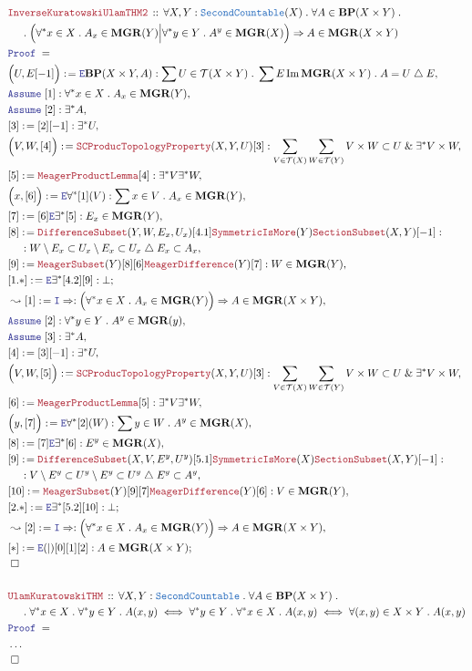 \documentclass[12pt]{scrartcl}
\newcommand{\TYPE}[1]{\textcolor{NavyBlue}{\mathtt{#1}}}
\newcommand{\LOGIC}[1]{\textcolor{Blue}{\mathtt{#1}}}
\newcommand{\THM}[1]{\textcolor{Maroon}{\mathtt{#1}}}
\renewcommand{\.}{\; . \;}
\newcommand{\de}{: \kern 0.1pc =}
\newcommand{\Theorem}[2]{& \THM{#1} \, :: \, #2 \\ & \Proof = \\ }
\newcommand{\NewLine}{\\ & \kern 1pc}
\newcommand{\Page}[1]{ \begin{align*} #1 \end{align*}   }
\newcommand{\NoProof}{ & \ldots \\ \EndProof}
\renewcommand{\And}{\; \& \;}
\newcommand{\Imply}{\Rightarrow}
\newcommand{\Intro}{\LOGIC{I}}
\newcommand{\Elim}{\LOGIC{E}}
\DeclareMathOperator*{\im}{Im}
\newcommand{\du}{\; \triangle \;}
\newcommand{\Say}[3]{& #1 \de #2 : #3, \\}
\newcommand{\Conclude}[3]{& #1 \de #2 : #3; \\}
\newcommand{\Derive}[3]{& \leadsto #1 \de #2 : #3, \\}
\newcommand{\Assume}[2]{& \LOGIC{Assume} \; #1 : #2, \\}
\newcommand{\QED}{\; \square}
\newcommand{\EndProof}{& \QED \\}
\newcommand{\Proof}{\LOGIC{Proof} \; }
\newcommand{\T}{\mathcal{T}}
\newcommand{\BP}{\mathbf{BP}}
\newcommand{\MGR}{\mathbf{MGR}}
\begin{document}
\Page{
	\Theorem{InverseKuratowskiUlamTHM2}
	{
		\forall X,Y : \TYPE{SecondCountable}(X) \.
		\forall A \in \BP(X \times Y) \. 
		\NewLine \. \Big(
		\forall^* x \in X \.  A_x \in \MGR(Y)
		\Big|
		\forall^* y \in Y \. A^y \in \MGR(X) \Big)
		\Imply
		A \in \MGR(X \times Y)
	}
	\Say{\Big(U,E [-1]\Big)}{\Elim \BP(X \times Y,A)}
	{
		\sum U \in \T(X \times Y) \.
		\sum E \im \MGR(X \times Y) \.
		A = U \du E 
	}
	\Assume{[1]}{\forall^* x \in X \.  A_x \in \MGR(Y)}
	\Assume{[2]}{\exists^* A}
	\Say{[3]}{[2][-1]}{\exists^* U}
	\Say{\Big(V,W,[4]\Big)}{\THM{SCProducTopologyProperty}(X,Y,U)[3]}
	{
		\sum_{V \in \T(X) }
		\sum_{W \in \T(Y)} 
		V \times W \subset U
		\And
		\exists^* V \times W
	}
	\Say{[5]}{\THM{MeagerProductLemma}[4]}
	{
			\exists^* V  \exists^* W
	}
	\Say{\Big(x,[6]\Big)}
	{
		\Elim \forall^* [1](V)
	}
	{
		\sum x \in V \. A_x \in \MGR(Y)
	}
	\Say{[7]}{[6]\Elim \exists^*[5]}
	{
		E_x \in \MGR(Y)
	}
	\Say{[8]}{
		\THM{DifferenceSubset}(Y,W,E_x,U_x)[4.1]
		\THM{SymmetricIsMore}(Y)
		\THM{SectionSubset}(X,Y)[-1]	
	}
	{
		\NewLine :
		W \setminus E_x \subset U_x \setminus E_x \subset U_x \du E_x \subset A_x 
	}
	\Say{[9]}{\THM{MeagerSubset}(Y)[8][6]\THM{MeagerDifference}(Y)[7]}
	{
		W \in \MGR(Y)
	}
	\Conclude{[1.*]}{\Elim \exists^* [4.2][9]}{\bot}
	\Derive{[1]}{\Intro \Imply}
	{
		\Big(\forall^* x \in X \. A_x \in \MGR(Y) \Big)
		\Imply
		A \in \MGR(X \times Y)
	}
	\Assume{[2]}{\forall^* y \in Y \.  A^y \in \MGR(y)}
	\Assume{[3]}{\exists^* A}
	\Say{[4]}{[3][-1]}{\exists^* U}
	\Say{\Big(V,W,[5]\Big)}{\THM{SCProducTopologyProperty}(X,Y,U)[3]}
	{
		\sum_{V \in \T(X) }
		\sum_{W \in \T(Y)} 
		V \times W \subset U
		\And
		\exists^* V \times W
	}
	\Say{[6]}{\THM{MeagerProductLemma}[5]}
	{
			\exists^* V  \exists^* W
	}
	\Say{\Big(y,[7]\Big)}
	{
		\Elim \forall^* [2](W)
	}
	{
		\sum y \in W \. A^y \in \MGR(X)
	}
	\Say{[8]}{[7]\Elim \exists^*[6]}
	{
		E^y \in \MGR(X)
	}
	\Say{[9]}{
		\THM{DifferenceSubset}(X,V,E^y,U^y)[5.1]
		\THM{SymmetricIsMore}(X)
		\THM{SectionSubset}(X,Y)[-1]	
	}
	{
		\NewLine :		
		V \setminus E^y \subset U^y \setminus E^y \subset U^y \du E^y \subset A^y 
	}
	\Say{[10]}{\THM{MeagerSubset}(Y)[9][7]\THM{MeagerDifference}(Y)[6]}
	{
		V \in \MGR(Y)
	}
	\Conclude{[2.*]}{\Elim \exists^* [5.2][10]}{\bot}
	\Derive{[2]}{\Intro \Imply}
	{
		\Big(\forall^* x \in X \. A_x \in \MGR(Y) \Big)
		\Imply
		A \in \MGR(X \times Y)
	}
	\Conclude{[*]}{\Elim(|)[0][1][2]}{A \in \MGR(X \times Y)}
	\EndProof
	\\
	\Theorem{UlamKuratowskiTHM}
	{
		\forall X,Y: \TYPE{SecondCountable} \.
		\forall A \in \BP(X \times Y) \. \NewLine \.
		\forall^* x \in X \. \forall^* y \in Y \. A(x,y)
		\iff
		\forall^* y \in Y \. \forall^* x \in X \. A(x,y) 
		\iff
		\forall (x,y) \in X \times Y \. A(x,y)
	}
	\NoProof
}
\end{document}
